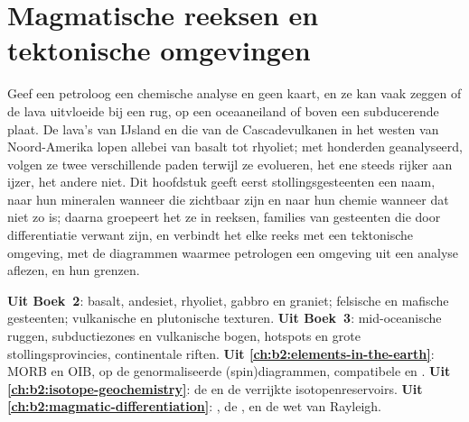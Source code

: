 \chapter{Magmatische reeksen en tektonische omgevingen}\label{ch:b2:magmatic-series}

Geef een petroloog een chemische analyse en geen kaart, en ze kan vaak zeggen of de
lava uitvloeide bij een rug, op een oceaaneiland of boven een subducerende plaat. De lava's
van IJsland en die van de Cascadevulkanen in het westen van Noord-Amerika lopen allebei
van basalt tot rhyoliet; met honderden geanalyseerd, volgen ze twee verschillende paden terwijl
ze evolueren, het ene steeds rijker aan ijzer, het andere niet. Dit hoofdstuk geeft eerst
stollingsgesteenten een naam, naar hun mineralen wanneer die zichtbaar zijn en naar hun
chemie wanneer dat niet zo is; daarna groepeert het ze in reeksen, families van gesteenten
die door differentiatie verwant zijn, en verbindt het elke reeks met een tektonische omgeving, met de
diagrammen waarmee petrologen een omgeving uit een analyse aflezen, en hun grenzen.

\begin{recall}
\textbf{Uit Boek~2}: basalt, andesiet, rhyoliet, gabbro en graniet;
felsische en mafische gesteenten; vulkanische en plutonische texturen. \textbf{Uit
Boek~3}: mid-oceanische ruggen, subductiezones en vulkanische bogen, hotspots en grote
stollingsprovincies, continentale riften. \textbf{Uit \cref{ch:b2:elements-in-the-earth}}:
MORB en OIB, op de  genormaliseerde (spin)diagrammen, compatibele en
. \textbf{Uit \cref{ch:b2:isotope-geochemistry}}: de  en de verrijkte isotopenreservoirs. \textbf{Uit
\cref{ch:b2:magmatic-differentiation}}: , de ,  en de wet van Rayleigh.
\end{recall}

